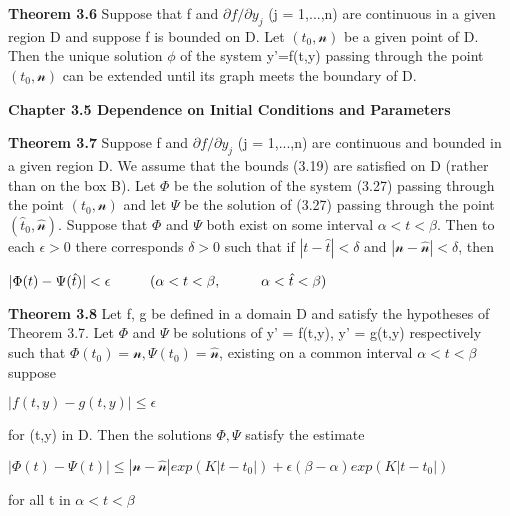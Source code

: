 \documentclass{article}
\newcommand\tab[1][1cm]{\hspace*{#1}}
\begin{document}
\textbf {Theorem 3.6} Suppose that f and $\partial f / \partial y_j$ (j = 1,...,n) are continuous in a given region D and suppose f is bounded on D. Let $(t_0, \mathscr{n})$ be a given point of D. Then the unique solution $\phi$ of the system y'=f(t,y) passing through the point $(t_0, \mathscr{n})$ can be extended until its graph meets the boundary of D.

\textbf {Chapter 3.5 Dependence on Initial Conditions and Parameters}

\textbf {Theorem 3.7} Suppose f and $\partial f / \partial y_j$ (j = 1,...,n) are continuous and bounded in a given region D. We assume that the bounds (3.19) are satisfied on D (rather than on the box B). Let $\Phi$ be the solution of the system (3.27) passing through the point $(t_0, \mathscr{n})$ and let $\Psi$ be the solution of (3.27) passing through the point $(\hat{t}_0, \hat{\mathscr{n}})$. Suppose that $\Phi$ and $\Psi$ both exist on some interval $\alpha < t < \beta$. Then to each $\epsilon > 0$ there corresponds $\delta > 0$ such that if $| t - \hat{t}| < \delta $ and $| \mathscr{n} - \hat{\mathscr{n}}| < \delta$, then
\begin{center}
$| \Phi(t) - \Psi(\hat{t})| < \epsilon \tab (\alpha < t < \beta, \tab \alpha < \hat{t} < \beta)$
\end{center}

\textbf {Theorem 3.8} Let f, g be defined in a domain D and satisfy the hypotheses of Theorem 3.7. Let $\Phi$ and $\Psi$ be solutions of y' = f(t,y), y' = g(t,y) respectively such that $\Phi(t_0) = \mathscr{n}, \Psi(t_0) = \hat{\mathscr{n}}$, existing on a common interval $\alpha < t < \beta$ suppose 
\begin{center} 
$|f(t,y) - g(t,y)| \leq \epsilon$
\end{center}
for (t,y) in D. Then the solutions $\Phi, \Psi$ satisfy the estimate
\begin{center}
$|\Phi(t) - \Psi(t)| \leq | \mathscr{n} - \hat{\mathscr{n}}| exp(K|t-t_0|) + \epsilon(\beta - \alpha) exp (K|t-t_0|)$
\end{center}
for all t in $\alpha < t < \beta$
\end{document}
